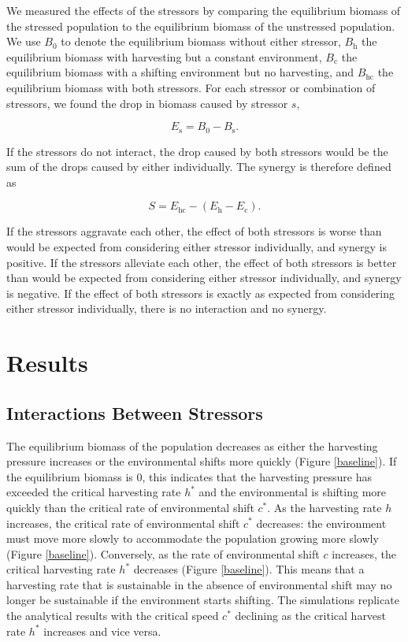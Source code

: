 \documentclass[12pt,english]{article}
\begin{document}
\begin{spacing}{1.9}
\begin{flushleft}
We measured the effects of the stressors by comparing the equilibrium biomass of the stressed population to 
the equilibrium biomass of the unstressed population. We use $B_0$ to denote the equilibrium biomass 
without either stressor, $B_\text{h}$ the equilibrium biomass with harvesting but a constant environment, $B_\text{c}$ the 
equilibrium biomass with a shifting environment but no harvesting, and $B_\text{hc}$ the equilibrium biomass with 
both stressors. For each stressor or combination of stressors, we found the drop in  biomass caused 
by stressor $s$,

\[E_\text{s}=B_0-B_\text{s}.\]

\noindent If the stressors do not interact, the drop caused by both stressors would be the sum of the drops caused by 
either individually. The synergy is therefore defined as

\[S = E_\text{hc}-\left(E_\text{h}-E_\text{c}\right).\]

\noindent If the stressors aggravate each other, the effect of both stressors is worse than would be expected from 
considering either stressor individually, and synergy is positive. If the stressors alleviate each other, the effect 
of both stressors is better than would be expected from considering either stressor individually, and synergy is 
negative. If the effect of both stressors is exactly as expected from considering either stressor individually, 
there is no interaction and no synergy.

\section{Results}

\subsection{Interactions Between Stressors }

The equilibrium biomass of the population decreases as either the harvesting pressure 
increases or the environmental shifts more quickly (Figure \ref{baseline}). If the equilibrium biomass is $0$, this 
indicates that the harvesting pressure has exceeded the critical harvesting rate $h^*$ and the environmental 
is shifting more quickly than the critical rate of environmental shift $c^*$. As the harvesting rate $h$ increases, 
the critical rate of environmental shift $c^*$ decreases: the environment must move more slowly to 
accommodate the population growing more slowly (Figure \ref{baseline}). Conversely, as the rate of 
environmental shift $c$ increases, the critical harvesting rate $h^*$ decreases (Figure  \ref{baseline}). This 
means that a harvesting rate that is sustainable in the absence of environmental shift may no longer be sustainable if 
the environment starts shifting. The simulations replicate the analytical results with the critical speed $c^*$ 
declining as the critical harvest rate $h^*$ increases and vice versa.


\end{flushleft}
\end{spacing}
\end{document}
